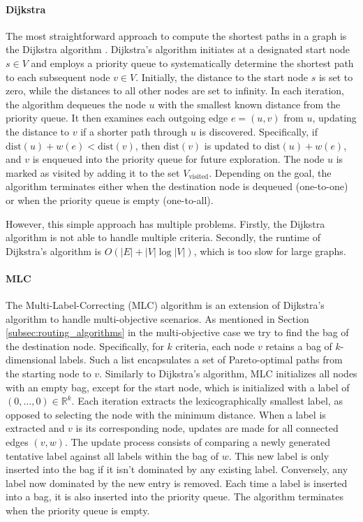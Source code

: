 \paragraph{Dijkstra}
\label{subsubsec:dijkstra}
The most straightforward approach to compute the shortest paths in a graph is the Dijkstra algorithm .
Dijkstra's algorithm initiates at a designated start node \( s \in V \) and employs a priority queue to systematically determine the shortest path to each subsequent node \( v \in V \).
Initially, the distance to the start node \( s \) is set to zero, while the distances to all other nodes are set to infinity.
In each iteration, the algorithm dequeues the node \( u \) with the smallest known distance from the priority queue.
It then examines each outgoing edge \( e = (u, v) \) from \( u \), updating the distance to \( v \) if a shorter path through \( u \) is discovered.
Specifically, if \( \text{dist}(u) + w(e) < \text{dist}(v) \), then \( \text{dist}(v) \) is updated to \( \text{dist}(u) + w(e) \), and \( v \) is enqueued into the priority queue for future exploration.
The node \( u \) is marked as visited by adding it to the set \( V_{\text{visited}} \).
Depending on the goal, the algorithm terminates either when the destination node is dequeued (one-to-one) or when the priority queue is empty (one-to-all).


However, this simple approach has multiple problems.
Firstly, the Dijkstra algorithm is not able to handle multiple criteria.
Secondly, the runtime of Dijkstra's algorithm is \( O(|E| + |V| \log |V|) \), which is too slow for large graphs.

\paragraph{MLC}
\label{subsubsec:mlc}

The Multi-Label-Correcting (MLC)  algorithm is an extension of Dijkstra's algorithm to handle multi-objective scenarios.
As mentioned in Section \ref{subsec:routing_algorithms} in the multi-objective case we try to find the bag of the destination node.
Specifically, for \(k\) criteria, each node \(v\) retains a bag of \(k\)-dimensional labels. Such a list encapsulates a set of Pareto-optimal paths from the starting node to \(v\).
Similarly to Dijkstra's algorithm, MLC initializes all nodes with an empty bag, except for the start node, which is initialized with a label of \( (0, \dots, 0) \in \mathbb{R}^k \).
Each iteration extracts the lexicographically smallest label, as opposed to selecting the node with the minimum distance.
When a label is extracted and \(v\) is its corresponding node, updates are made for all connected edges \( (v, w) \).
The update process consists of comparing a newly generated tentative label against all labels within the bag of \(w\).
This new label is only inserted into the bag if it isn't dominated by any existing label.
Conversely, any label now dominated by the new entry is removed.
Each time a label is inserted into a bag, it is also inserted into the priority queue.
The algorithm terminates when the priority queue is empty.


